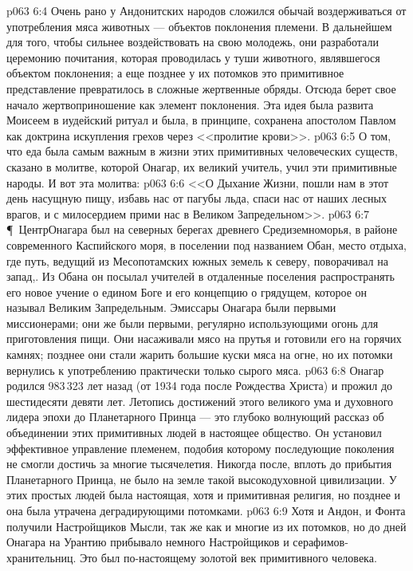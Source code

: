 \vs p063 6:4 Очень рано у Андонитских народов сложился обычай воздерживаться от употребления мяса животных --- объектов поклонения племени. В дальнейшем для того, чтобы сильнее воздействовать на свою молодежь, они разработали церемонию почитания, которая проводилась у туши животного, являвшегося объектом поклонения; а еще позднее у их потомков это примитивное представление превратилось в сложные жертвенные обряды. Отсюда берет свое начало жертвоприношение как элемент поклонения. Эта идея была развита Моисеем в иудейский ритуал и была, в принципе, сохранена апостолом Павлом как доктрина искупления грехов через <<пролитие крови>>.
\vs p063 6:5 О том, что еда была самым важным в жизни этих примитивных человеческих существ, сказано в молитве, которой Онагар, их великий учитель, учил эти примитивные народы. И вот эта молитва:
\vs p063 6:6 <<О Дыхание Жизни, пошли нам в этот день насущную пищу, избавь нас от пагубы льда, спаси нас от наших лесных врагов, и с милосердием прими нас в Великом Запредельном>>.
\vs p063 6:7 \P\ ЦентрОнагара был на северных берегах древнего Средиземноморья, в районе современного Каспийского моря, в поселении под названием Обан, место отдыха, где путь, ведущий из Месопотамских южных земель к северу, поворачивал на запад,. Из Обана он посылал учителей в отдаленные поселения распространять его новое учение о едином Боге и его концепцию о грядущем, которое он называл Великим Запредельным. Эмиссары Онагара были первыми миссионерами; они же были первыми, регулярно использующими огонь для приготовления пищи. Они насаживали мясо на прутья и готовили его на горячих камнях; позднее они стали жарить большие куски мяса на огне, но их потомки вернулись к употреблению практически только сырого мяса.
\vs p063 6:8 Онагар родился 983\,323 лет назад (от 1934 года после Рождества Христа) и прожил до шестидесяти девяти лет. Летопись достижений этого великого ума и духовного лидера эпохи до Планетарного Принца --- это глубоко волнующий рассказ об объединении этих примитивных людей в настоящее общество. Он установил эффективное управление племенем, подобия которому последующие поколения не смогли достичь за многие тысячелетия. Никогда после, вплоть до прибытия Планетарного Принца, не было на земле такой высокодуховной цивилизации. У этих простых людей была настоящая, хотя и примитивная религия, но позднее и она была утрачена деградирующими потомками.
\vs p063 6:9 Хотя и Андон, и Фонта получили Настройщиков Мысли, так же как и многие из их потомков, но до дней Онагара на Урантию прибывало немного Настройщиков и серафимов\hyp{}хранительниц. Это был по\hyp{}настоящему золотой век примитивного человека.
